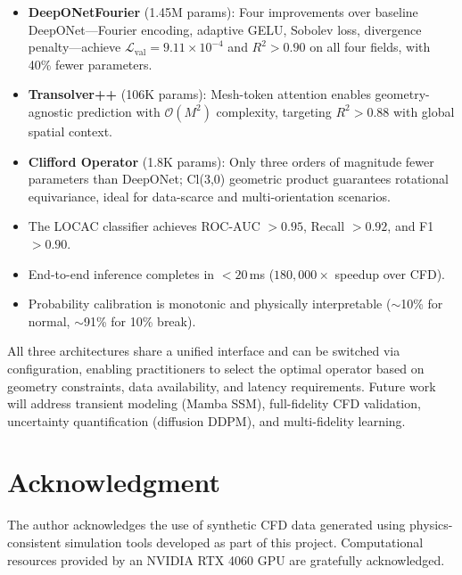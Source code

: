 \documentclass[conference]{IEEEtran}
\begin{document}
\begin{itemize}
    \item \textbf{DeepONetFourier} (1.45M params): Four improvements over baseline DeepONet---Fourier encoding, adaptive GELU, Sobolev loss, divergence penalty---achieve $\mathcal{L}_\text{val} = 9.11\times10^{-4}$ and $R^2 > 0.90$ on all four fields, with 40\% fewer parameters.
    \item \textbf{Transolver++} (106K params): Mesh-token attention enables geometry-agnostic prediction with $\mathcal{O}(M^2)$ complexity, targeting $R^2 > 0.88$ with global spatial context.
    \item \textbf{Clifford Operator} (1.8K params): Only three orders of magnitude fewer parameters than DeepONet; Cl(3,0) geometric product guarantees rotational equivariance, ideal for data-scarce and multi-orientation scenarios.
    \item The LOCAC classifier achieves ROC-AUC $> 0.95$, Recall $> 0.92$, and F1 $> 0.90$.
    \item End-to-end inference completes in $< 20$\,ms ($180{,}000\times$ speedup over CFD).
    \item Probability calibration is monotonic and physically interpretable ($\sim$10\% for normal, $\sim$91\% for 10\% break).
\end{itemize}

All three architectures share a unified interface and can be switched via configuration, enabling practitioners to select the optimal operator based on geometry constraints, data availability, and latency requirements. Future work will address transient modeling (Mamba SSM), full-fidelity CFD validation, uncertainty quantification (diffusion DDPM), and multi-fidelity learning.

\section*{Acknowledgment}
The author acknowledges the use of synthetic CFD data generated using physics-consistent simulation tools developed as part of this project. Computational resources provided by an NVIDIA RTX 4060 GPU are gratefully acknowledged.
\end{document}
